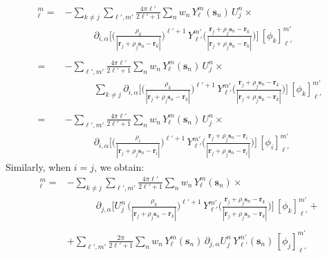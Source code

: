 \documentclass[12pt,letterpaper,oneside]{article}
\theoremstyle{definition}
\begin{document}
\begin{align*}
[(\partial_{i,\alpha} A) \phi\,_j]_\ell^m = & -\sum_{k\ne j}\sum_{\ell',m'}  \frac{4 \pi \ell'}{2 \ell'+1} \sum_n w_n \, Y_\ell^m(\boldsymbol{s}_n) \, U_j^n \times \\
& \qquad \quad \partial_{i,\alpha} \bigg[ \bigg( \frac{\rho_k}{| \boldsymbol{r}_j + \rho_j \boldsymbol{s}_n - \boldsymbol{r}_k |} \bigg)^{\ell'+1} \, Y_{\ell'}^{m'} \bigg( \frac{\boldsymbol{r}_j + \rho_j \boldsymbol{s}_n - \boldsymbol{r}_k}{| \boldsymbol{r}_j + \rho_j \boldsymbol{s}_n - \boldsymbol{r}_k |} \bigg) \bigg] \, [\phi_k]_{\ell '}^{m '} \\ \\
= & -\sum_{\ell',m'}  \frac{4 \pi \ell'}{2 \ell'+1} \sum_n w_n \, Y_\ell^m(\boldsymbol{s}_n) \, U_j^n \times \\
& \qquad \quad \sum_{k\ne j} \partial_{i,\alpha} \bigg[ \bigg( \frac{\rho_k}{| \boldsymbol{r}_j + \rho_j \boldsymbol{s}_n - \boldsymbol{r}_k |} \bigg)^{\ell'+1} \, Y_{\ell'}^{m'} \bigg( \frac{\boldsymbol{r}_j + \rho_j \boldsymbol{s}_n - \boldsymbol{r}_k}{| \boldsymbol{r}_j + \rho_j \boldsymbol{s}_n - \boldsymbol{r}_k |} \bigg) \bigg] \, [\phi_k]_{\ell '}^{m '} \\ \\
= & -\sum_{\ell',m'}  \frac{4 \pi \ell'}{2 \ell'+1} \sum_n w_n \, Y_\ell^m(\boldsymbol{s}_n) \, U_j^n \times \\
& \qquad \quad \partial_{i,\alpha} \bigg[ \bigg( \frac{\rho_i}{| \boldsymbol{r}_j + \rho_j \boldsymbol{s}_n - \boldsymbol{r}_i |} \bigg)^{\ell'+1} \, Y_{\ell'}^{m'} \bigg( \frac{\boldsymbol{r}_j + \rho_j \boldsymbol{s}_n - \boldsymbol{r}_i}{| \boldsymbol{r}_j + \rho_j \boldsymbol{s}_n - \boldsymbol{r}_i |} \bigg) \bigg] \, [\phi_i]_{\ell '}^{m '}
\end{align*}
Similarly, when $i = j$, we obtain:
\begin{align*}
[(\partial_{j,\alpha} A) \phi \,_j]_\ell^m  = & - \sum_{k\ne j} \sum_{\ell',m'}\frac{4 \pi \ell'}{2 \ell'+1} \sum_n w_n \, Y_\ell^m(\boldsymbol{s}_n) \times \\
& \qquad \quad \partial_{j,\alpha} \bigg[ U_j^n  \, \bigg( \frac{\rho_k}{|\boldsymbol{r}_j + \rho_j \boldsymbol{s}_n - \boldsymbol{r}_k|} \bigg)^{\ell'+1} \, Y_{\ell'}^{m'} \bigg( \frac{\boldsymbol{r}_j + \rho_j \boldsymbol{s}_n - \boldsymbol{r}_k}{|\boldsymbol{r}_j + \rho_j \boldsymbol{s}_n - \boldsymbol{r}_k |} \bigg) \bigg] \,  [\phi_k]_{\ell'}^{m'} +  \\  \\
& + \sum_{\ell',m'} \frac{2\pi}{2 \ell'+1}  \sum_n w_n \, Y_\ell^m(\boldsymbol{s}_n) \, \partial_{j,\alpha} U_j^n \, Y_{\ell'}^{m'}(\boldsymbol{s}_n) \, [\phi_j]_{\ell '}^{m '} 
\end{align*}
\end{document}
